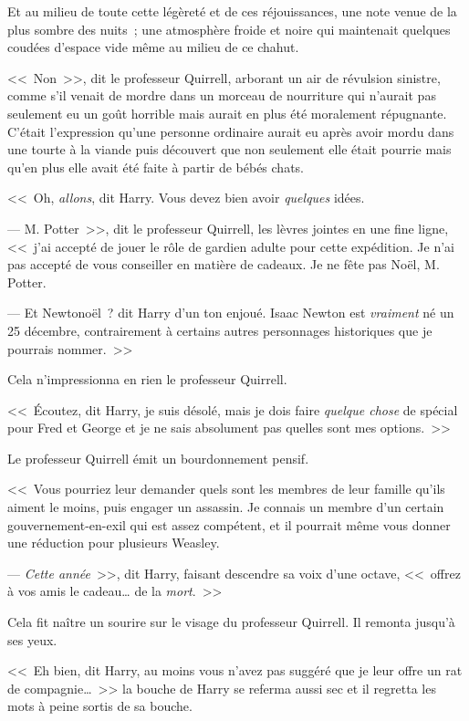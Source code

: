 Et au milieu de toute cette légèreté et de ces réjouissances, une note venue de la plus sombre des nuits~; une atmosphère froide et noire qui maintenait quelques coudées d'espace vide même au milieu de ce chahut.

<<~Non~>>, dit le professeur Quirrell, arborant un air de révulsion sinistre, comme s'il venait de mordre dans un morceau de nourriture qui n'aurait pas seulement eu un goût horrible mais aurait en plus été moralement répugnante. C'était l'expression qu'une personne ordinaire aurait eu après avoir mordu dans une tourte à la viande puis découvert que non seulement elle était pourrie mais qu'en plus elle avait été faite à partir de bébés chats.

<<~Oh, \emph{allons}, dit Harry. Vous devez bien avoir \emph{quelques} idées.

--- M. Potter~>>, dit le professeur Quirrell, les lèvres jointes en une fine ligne, <<~j'ai accepté de jouer le rôle de gardien adulte pour cette expédition. Je n'ai pas accepté de vous conseiller en matière de cadeaux. Je ne fête pas Noël, M. Potter.

--- Et Newtonoël~? dit Harry d'un ton enjoué. Isaac Newton est \emph{vraiment} né un 25 décembre, contrairement à certains autres personnages historiques que je pourrais nommer.~>>

Cela n'impressionna en rien le professeur Quirrell.

<<~Écoutez, dit Harry, je suis désolé, mais je dois faire \emph{quelque chose} de spécial pour Fred et George et je ne sais absolument pas quelles sont mes options.~>>

Le professeur Quirrell émit un bourdonnement pensif.

<<~Vous pourriez leur demander quels sont les membres de leur famille qu'ils aiment le moins, puis engager un assassin. Je connais un membre d'un certain gouvernement-en-exil qui est assez compétent, et il pourrait même vous donner une réduction pour plusieurs Weasley.

--- \emph{Cette année}~>>, dit Harry, faisant descendre sa voix d'une octave, <<~offrez à vos amis le cadeau… de la \emph{mort}.~>>

Cela fit naître un sourire sur le visage du professeur Quirrell. Il remonta jusqu'à ses yeux.

<<~Eh bien, dit Harry, au moins vous n'avez pas suggéré que je leur offre un rat de compagnie…~>> la bouche de Harry se referma aussi sec et il regretta les mots à peine sortis de sa bouche.

